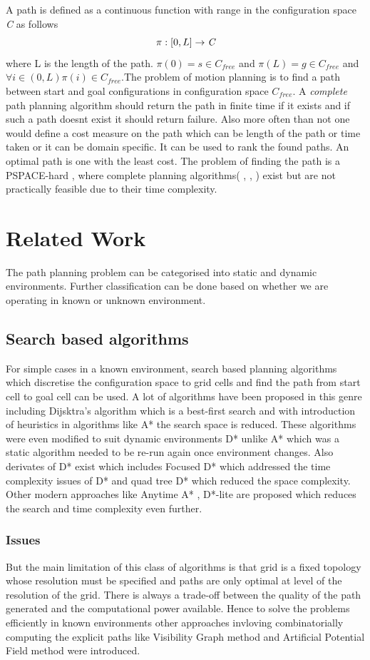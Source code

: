 \documentclass[MTech]{iitmdiss}
\begin{document}
A path is defined as a continuous function with range in the configuration space \emph{C} as follows $$\pi:[0,L] \rightarrow \emph{C}$$  where L is the length of the path. $\pi(0) = s \in C_{free}$ and $\pi(L) = g \in C_{free}$ and $\forall i \in (0,L) \pi(i) \in C_{free} $.The problem of motion planning is to find a path between start and goal configurations in configuration space \emph{$C_{free}$}. 
A \emph{complete} path planning algorithm should return the path in finite time if it exists and if such a path doesnt exist it should return failure. Also more often than not one would define a cost measure on the path which can be length of the path or time taken or it can be domain specific. It can be used to rank the found paths. An optimal path is one with the least cost. The problem of finding the path is a PSPACE-hard \cite{reif79} , where complete planning algorithms( \cite{perez79}, \cite{schsha83},  \cite{canny88} ) exist but are not practically feasible due to their time complexity.  

\section{Related Work}
The path planning problem can be categorised into static and dynamic environments. Further classification can be done based on whether we are operating in known or unknown environment. 
\subsection{Search based algorithms}
For simple cases in a known environment, search based planning algorithms which discretise the configuration space to grid cells and find the path from start cell to goal cell can be used. A lot of algorithms have been proposed in this genre including Dijsktra's algorithm \cite{d59} which is a best-first search and with introduction of heuristics in algorithms like A*\cite{hnb68} the search space is reduced. These algorithms were even modified to suit dynamic environments D* \cite{stentz94} unlike A* which was a static algorithm needed to be re-run again once environment changes. Also derivates of D* exist which includes Focused D* \cite{stentz95} which addressed the time complexity issues of D*  and quad tree D* \cite{samet88} which reduced the space complexity. Other modern approaches like Anytime A* \cite{hr07}, D*-lite \cite{koeni02} are proposed which reduces the search and time complexity even further.

\subsubsection{Issues}
 But the main limitation of this class of algorithms is that grid is a fixed topology whose resolution must be specified and paths are only optimal at level of  the resolution of the grid. There is always a trade-off between the quality of the path generated and the computational power available. Hence to solve the problems efficiently in known environments other approaches invloving combinatorially computing the explicit paths like Visibility Graph method \cite{visgraph00} and Artificial Potential Field method \cite{khatib86} were introduced. 
 
\end{document}
